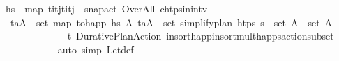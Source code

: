 \begin{isabellebody}
\ {\isacharquery}{\kern0pt}hs\ {\isacharequal}{\kern0pt}\ {\isachardoublequoteopen}map\ {\isacharparenleft}{\kern0pt}{\isasymlambda}{\isacharparenleft}{\kern0pt}t\isactrlsub i{\isacharcomma}{\kern0pt}t\isactrlsub j{\isacharparenright}{\kern0pt}{\isachardot}{\kern0pt}{\isacharparenleft}{\kern0pt}{\isacharparenleft}{\kern0pt}t\isactrlsub i{\isacharplus}{\kern0pt}t\isactrlsub j{\isacharparenright}{\kern0pt}\ {\isacharslash}{\kern0pt}\ {}{\isacharcomma}{\kern0pt}{\isacharquery}{\kern0pt}snap{\isacharunderscore}{\kern0pt}act\ Over{\isacharunderscore}{\kern0pt}All{\isacharparenright}{\kern0pt}{\isacharparenright}{\kern0pt}\ {\isacharquery}{\kern0pt}chtps{\isacharunderscore}{\kern0pt}in{\isacharunderscore}{\kern0pt}intv{\isachardoublequoteclose}\isanewline
\ \ \ \ \ \ \ \ \isamarkupfalse%
\ {}{\isacharcolon}{\kern0pt}\ {\isachardoublequoteopen}{\isasymforall}{\isacharparenleft}{\kern0pt}t\isactrlsub a{\isacharcomma}{\kern0pt}A{\isacharparenright}{\kern0pt}\ {\isasymin}\ set\ {\isacharparenleft}{\kern0pt}map\ {\isacharquery}{\kern0pt}to{\isacharunderscore}{\kern0pt}happ\ {\isacharquery}{\kern0pt}hs\ {\isasymexists}A{\isacharprime}{\kern0pt}{\isachardot}{\kern0pt}\ {\isacharparenleft}{\kern0pt}t\isactrlsub a{\isacharcomma}{\kern0pt}A{\isacharprime}{\kern0pt}{\isacharparenright}{\kern0pt}\ {\isasymin}\ set\ {\isacharparenleft}{\kern0pt}simplify{\isacharunderscore}{\kern0pt}plan\ htps\ {\isacharparenleft}{\kern0pt}{\isasympi}{\isacharhash}{\kern0pt}{\isasympi}s{\isacharparenright}{\kern0pt}{\isacharparenright}{\kern0pt}\ {\isasymand}\ set\ A\ {\isasymsubseteq}\ set\ A{\isacharprime}{\kern0pt}{\isachardoublequoteclose}\isanewline
\ \ \ \ \ \ \ \ \ \ \isamarkupfalse%
\ {\isacartoucheopen}{\isasympi}\ {\isacharequal}{\kern0pt}\ {\isacharparenleft}{\kern0pt}t\isactrlsub {\isasympi}{\isacharcomma}{\kern0pt}{\isasympi}{\isacharprime}{\kern0pt}{\isacharparenright}{\kern0pt}{\isacartoucheclose}\ Durative{\isacharunderscore}{\kern0pt}Plan{\isacharunderscore}{\kern0pt}Action\ insort{\isacharunderscore}{\kern0pt}happ{}{\isacharunderscore}{\kern0pt}insort{\isacharunderscore}{\kern0pt}mult{\isacharunderscore}{\kern0pt}happs{\isacharunderscore}{\kern0pt}action{\isacharunderscore}{\kern0pt}subset\isanewline
\ \ \ \ \ \ \ \ \ \ \isamarkupfalse%
\ {\isacharparenleft}{\kern0pt}auto\ simp{\isacharcolon}{\kern0pt}\ Let{\isacharunderscore}{\kern0pt}def{\isacharparenright}{\kern0pt}\isanewline

\end{isabellebody}
